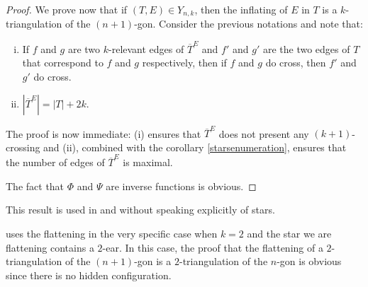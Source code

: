 \documentclass[12pt]{amsart}
\begin{document}
\begin{proof}
\bigskip
We prove now that if $(T,E)\in Y_{n,k}$, then the inflating of $E$ in $T$ is a $k$-triangulation of the $(n+1)$-gon. Consider the previous notations and note that:
\begin{enumerate}[(i)]
\item If $f$ and $g$ are two $k$-relevant edges of $\overline{T}^E$ and $f'$ and $g'$ are the two edges of $T$ that correspond to $f$ and $g$ respectively, then if $f$ and $g$ do cross, then $f'$ and $g'$ do cross.
\item $|\overline{T}^E|=|T|+2k$.
\end{enumerate}

The proof is now immediate: (i) ensures that $\overline{T}^E$ does not present any $(k+1)$-crossing and (ii), combined with the corollary \ref{starsenumeration}, ensures that the number of edges of $\overline{T}^E$ is maximal.

\bigskip
The fact that $\Phi$ and $\Psi$ are inverse functions is obvious.
\end{proof}

\begin{bibremark}
This result is used in \cite{n-gdfcp-00} and \cite{j-gt} without speaking explicitly of stars.

\cite{e-btdp-06} uses the flattening in the very specific case when $k=2$ and the star we are flattening contains a $2$-ear. In this case, the proof that the flattening of a $2$-triangulation of the $(n+1)$-gon is a $2$-triangulation of the $n$-gon is obvious since there is no hidden configuration.

\end{bibremark}
\end{document}
